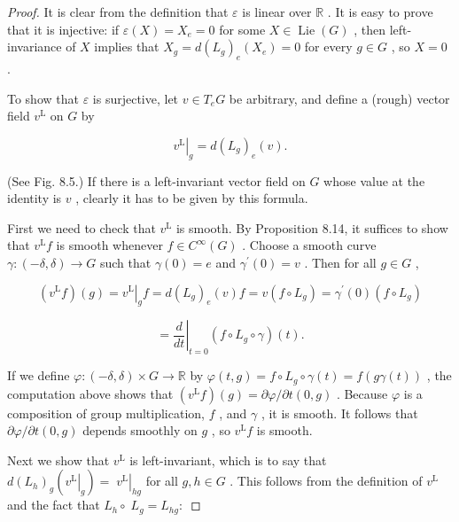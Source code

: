 \begin{proof}
\leanok
It is clear from the definition that $\varepsilon$ is linear over $\mathbb{R}$ . It is easy to prove that it is injective: if $\varepsilon \left( X\right)  = {X}_{e} = 0$ for some $X \in  \operatorname{Lie}\left( G\right)$ , then left-invariance of $X$ implies that ${X}_{g} = d{\left( {L}_{g}\right) }_{e}\left( {X}_{e}\right)  = 0$ for every $g \in  G$ , so $X = 0$ .

To show that $\varepsilon$ is surjective, let $v \in  {T}_{e}G$ be arbitrary, and define a (rough) vector field ${v}^{\mathrm{L}}$ on $G$ by

\[
{\left. {v}^{\mathrm{L}}\right| }_{g} = d{\left( {L}_{g}\right) }_{e}\left( v\right) . \tag{8.13}
\]

(See Fig. 8.5.) If there is a left-invariant vector field on $G$ whose value at the identity is $v$ , clearly it has to be given by this formula.

First we need to check that ${v}^{\mathrm{L}}$ is smooth. By Proposition 8.14, it suffices to show that ${v}^{\mathrm{L}}f$ is smooth whenever $f \in  {C}^{\infty }\left( G\right)$ . Choose a smooth curve $\gamma  : \left( {-\delta ,\delta }\right)  \rightarrow  G$ such that $\gamma \left( 0\right)  = e$ and ${\gamma }^{\prime }\left( 0\right)  = v$ . Then for all $g \in  G$ ,

\[
{\left. \left( {v}^{\mathrm{L}}f\right) \left( g\right)  = {v}^{\mathrm{L}}\right| }_{g}f = d{\left( {L}_{g}\right) }_{e}\left( v\right) f = v\left( {f \circ  {L}_{g}}\right)  = {\gamma }^{\prime }\left( 0\right) \left( {f \circ  {L}_{g}}\right)
\]

\[
= {\left. \frac{d}{dt}\right| }_{t = 0}\left( {f \circ  {L}_{g} \circ  \gamma }\right) \left( t\right) .
\]

If we define $\varphi  : \left( {-\delta ,\delta }\right)  \times  G \rightarrow  \mathbb{R}$ by $\varphi \left( {t, g}\right)  = f \circ  {L}_{g} \circ  \gamma \left( t\right)  = f\left( {{g\gamma }\left( t\right) }\right)$ , the computation above shows that $\left( {{v}^{\mathrm{L}}f}\right) \left( g\right)  = \partial \varphi /\partial t\left( {0, g}\right)$ . Because $\varphi$ is a composition of group multiplication, $f$ , and $\gamma$ , it is smooth. It follows that $\partial \varphi /\partial t\left( {0, g}\right)$ depends smoothly on $g$ , so ${v}^{\mathrm{L}}f$ is smooth.

Next we show that ${v}^{\mathrm{L}}$ is left-invariant, which is to say that $d{\left( {L}_{h}\right) }_{g}\left( {\left. {v}^{\mathrm{L}}\right| }_{g}\right)  = \; {\left. {v}^{\mathrm{L}}\right| }_{hg}$ for all $g, h \in  G$ . This follows from the definition of ${v}^{\mathrm{L}}$ and the fact that ${L}_{h} \circ \; {L}_{g} = {L}_{hg} :$


\end{proof}
